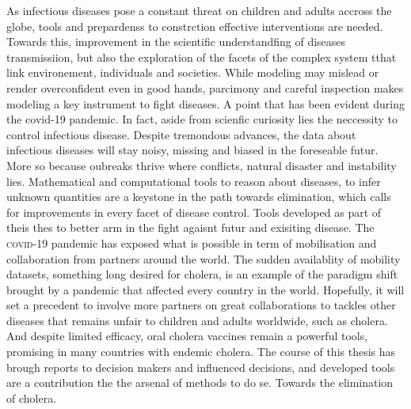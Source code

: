 As infectious diseases pose a constant threat on children and adults accross the globe, tools and prepardenss to constrction effective interventions are needed. Towards this, improvement in the scientific understandfing of diseases transmissiion, but also the exploration of the facets of the complex system tthat link environement, individuals and societies. While modeling may mislead or render overconfident even in good hands, parcimony and careful inspection makes modeling a key instrument to fight diseases. A point that has been evident during the covid-19 pandemic. In fact, aside from scienfic curiosity lies the neccessity to control infectious disease. Despite tremondous advances, the data about infectious diseases will stay noisy, missing and biased in the foreseable futur. More so because oubreaks thrive where conflicts, natural disaster and instability lies. Mathematical and computational tools to reason about diseases, to infer unknown quantities are a keystone in the path towards elimination, which calls for improvements in every facet of disease control. Tools developed as part of theis thes to better arm in the fight agaisnt futur and exisiting disease. The \textsc{covid}-19 pandemic has exposed what is possible in term of mobilisation and collaboration from partners around the world. The sudden availablity of mobility datasets, something long desired for cholera, is an example of the paradigm shift brought by a pandemic that affected every country in the world. Hopefully, it will set a precedent to involve more partners on great collaborations to tackles other diseases that remains unfair to children and adults worldwide, such as cholera.
And despite limited efficacy, oral cholera vaccines remain a powerful tools, promising in many countries with endemic cholera. 
The course of this thesis has brough reports to decision makers and influenced decisions, and developed tools are a contribution the the arsenal of methods to do se. Towards the elimination of cholera.

